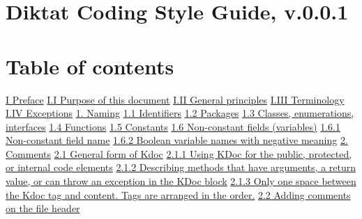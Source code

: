 
\hspace{0.0cm}\hyperref[sec:]{}
\section*{Diktat Coding Style Guide, v.0.0.1}
\section*{Table of contents}
\hspace{0.0cm}\hyperref[sec:]{I Preface}
\hspace{0.5cm}\hyperref[sec:]{ I.I Purpose of this document}
\hspace{0.5cm}\hyperref[sec:]{ I.II General principles}
\hspace{0.5cm}\hyperref[sec:]{ I.III Terminology}
\hspace{0.5cm}\hyperref[sec:]{ I.IV Exceptions}
\hspace{0.0cm}\hyperref[sec:1.]{1. Naming}
\hspace{0.5cm}\hyperref[sec:1.1]{ 1.1 Identifiers}
\hspace{0.5cm}\hyperref[sec:1.2]{ 1.2 Packages}
\hspace{0.5cm}\hyperref[sec:1.3]{ 1.3 Classes, enumerations, interfaces}
\hspace{0.5cm}\hyperref[sec:1.4]{ 1.4 Functions}
\hspace{0.5cm}\hyperref[sec:1.5]{ 1.5 Constants}
\hspace{0.5cm}\hyperref[sec:1.6]{ 1.6 Non-constant fields (variables)}
\hspace{1.0cm}\hyperref[sec:1.6.1]{ 1.6.1 Non-constant field name}
\hspace{1.0cm}\hyperref[sec:1.6.2]{ 1.6.2 Boolean variable names with negative meaning}
\hspace{0.0cm}\hyperref[sec:2.]{2. Comments}
\hspace{0.5cm}\hyperref[sec:2.1]{ 2.1 General form of Kdoc}
\hspace{1.0cm}\hyperref[sec:2.1.1]{ 2.1.1 Using KDoc for the public, protected, or internal code elements}
\hspace{1.0cm}\hyperref[sec:2.1.2]{ 2.1.2 Describing methods that have arguments, a return value, or can throw an exception in the KDoc block}
\hspace{1.0cm}\hyperref[sec:2.1.3]{ 2.1.3 Only one space between the Kdoc tag and content. Tags are arranged in the order.}
\hspace{0.5cm}\hyperref[sec:2.2]{ 2.2 Adding comments on the file header}
